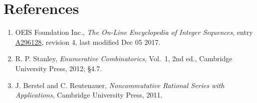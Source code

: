 \documentclass[11pt]{article}
\theoremstyle{definition}
\begin{document}
\section{References}

\begin{enumerate}

\item OEIS Foundation Inc., \emph{The On-Line Encyclopedia of Integer Sequences}, entry \href{https://oeis.org/A296128}{A296128}, revision 4, last modified Dec 05 2017.

\item R. P. Stanley, \emph{Enumerative Combinatorics}, Vol.~1, 2nd ed., Cambridge University Press, 2012; \S4.7.

\item J. Berstel and C. Reutenauer, \emph{Noncommutative Rational Series with Applications}, Cambridge University Press, 2011.

\end{enumerate}
\end{document}
